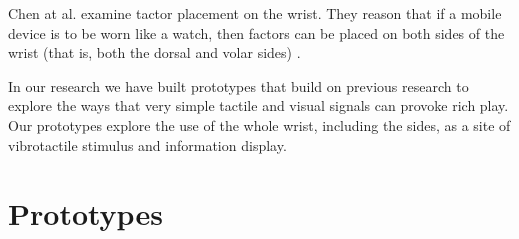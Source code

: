 \documentclass{chi-ext}
\begin{document}
Chen at al. examine tactor placement on the wrist. They reason that if a mobile device is to be worn like a watch, then factors can be placed on both sides of the wrist (that is, both the dorsal and volar sides) \cite{chen2008tactor}. 

In our research we have built prototypes that build on previous research to explore the ways that very simple tactile and visual signals can provoke rich play. Our prototypes explore the use of the whole wrist, including the sides, as a site of vibrotactile stimulus and information display. 

\section{Prototypes}


\end{document}
